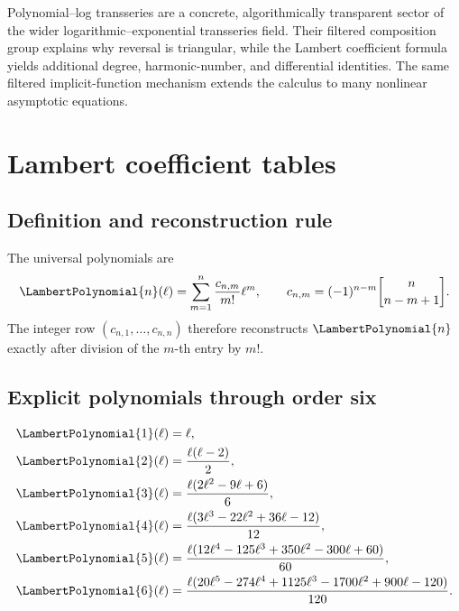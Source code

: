 \documentclass[11pt,openany]{book}
\theoremstyle{definition}
\theoremstyle{plain}
\theoremstyle{remark}
\newcommand{\stirlingone}[2]{\genfrac{[}{]}{0pt}{}{#1}{#2}}
\begin{document}
\begin{summarybox}
Polynomial--log transseries are a concrete, algorithmically transparent sector of the wider logarithmic--exponential transseries field. Their filtered composition group explains why reversal is triangular, while the Lambert coefficient formula yields additional degree, harmonic-number, and differential identities. The same filtered implicit-function mechanism extends the calculus to many nonlinear asymptotic equations.
\end{summarybox}

\appendix

\chapter{Lambert coefficient tables}\label{app:Lambert-tables}

\section{Definition and reconstruction rule}
The universal polynomials are
\begin{equation}\label{eq:appendix-Pn}
 \LambertPolynomial{n}(\ell)=\sum_{m=1}^{n}\frac{c_{n,m}}{m!}\ell^m,
 \qquad
 c_{n,m}=(-1)^{n-m}\stirlingone{n}{n-m+1}.
\end{equation}
The integer row \((c_{n,1},\ldots,c_{n,n})\) therefore reconstructs \(\LambertPolynomial{n}\) exactly after division of the \(m\)-th entry by \(m!\).

\section{Explicit polynomials through order six}
\begin{align*}
\LambertPolynomial{1}(\ell)={}&\ell,\\
\LambertPolynomial{2}(\ell)={}&\frac{\ell(\ell-2)}2,\\
\LambertPolynomial{3}(\ell)={}&\frac{\ell(2\ell^2-9\ell+6)}6,\\
\LambertPolynomial{4}(\ell)={}&\frac{\ell(3\ell^3-22\ell^2+36\ell-12)}{12},\\
\LambertPolynomial{5}(\ell)={}&\frac{\ell(12\ell^4-125\ell^3+350\ell^2-300\ell+60)}{60},\\
\LambertPolynomial{6}(\ell)={}&\frac{\ell(20\ell^5-274\ell^4+1125\ell^3-1700\ell^2+900\ell-120)}{120}.
\end{align*}
\end{document}
